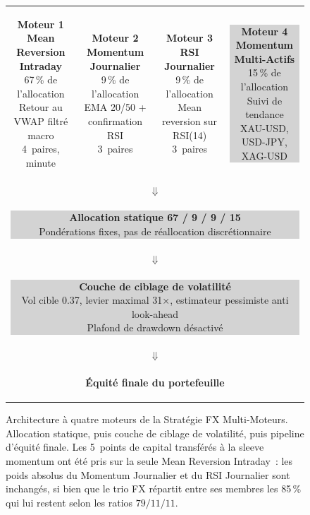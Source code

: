 \begin{figure}[htbp]
\centering
\small
\begin{tabular}{cccc}
\colorbox{softBlue}{\parbox{3.3cm}{\centering\color{primary}\sffamily\textbf{Moteur 1\\Mean Reversion Intraday}\\[0.2em]\footnotesize 67\,\% de l'allocation\\Retour au VWAP filtré macro\\4~paires, minute}} &
\colorbox{softYellow}{\parbox{3.3cm}{\centering\color{accent}\sffamily\textbf{Moteur 2\\Momentum Journalier}\\[0.2em]\footnotesize 9\,\% de l'allocation\\EMA 20/50 + confirmation RSI\\3~paires}} &
\colorbox{softGreen}{\parbox{3.3cm}{\centering\color{rsiGreen}\sffamily\textbf{Moteur 3\\RSI Journalier}\\[0.2em]\footnotesize 9\,\% de l'allocation\\Mean reversion sur RSI(14)\\3~paires}} &
\colorbox{lightGrey}{\parbox{3.3cm}{\centering\color{apogeeGold}\sffamily\textbf{Moteur 4\\Momentum Multi-Actifs}\\[0.2em]\footnotesize 15\,\% de l'allocation\\Suivi de tendance\\XAU-USD, USD-JPY, XAG-USD}} \\[1.2em]
\multicolumn{4}{c}{$\Downarrow$} \\[0.3em]
\multicolumn{4}{c}{\colorbox{lightGrey}{\parbox{12cm}{\centering\color{primary}\sffamily\textbf{Allocation statique 67 / 9 / 9 / 15}\\[0.1em]\footnotesize Pondérations fixes, pas de réallocation discrétionnaire}}} \\[0.6em]
\multicolumn{4}{c}{$\Downarrow$} \\[0.3em]
\multicolumn{4}{c}{\colorbox{lightGrey}{\parbox{12cm}{\centering\color{primary}\sffamily\textbf{Couche de ciblage de volatilité}\\[0.1em]\footnotesize Vol cible 0.37, levier maximal 31$\times$, estimateur pessimiste anti look-ahead\\Plafond de drawdown désactivé}}} \\[0.6em]
\multicolumn{4}{c}{$\Downarrow$} \\[0.3em]
\multicolumn{4}{c}{\colorbox{primary}{\parbox{12cm}{\centering\color{white}\sffamily\textbf{Équité finale du portefeuille}}}} \\
\end{tabular}
\caption{Architecture à quatre moteurs de la Stratégie FX Multi-Moteurs. Allocation statique, puis couche de ciblage de volatilité, puis pipeline d'équité finale. Les 5~points de capital transférés à la sleeve momentum ont été pris sur la seule Mean Reversion Intraday~: les poids absolus du Momentum Journalier et du RSI Journalier sont inchangés, si bien que le trio FX répartit entre ses membres les 85\,\% qui lui restent selon les ratios $79/11/11$.}
\end{figure}

